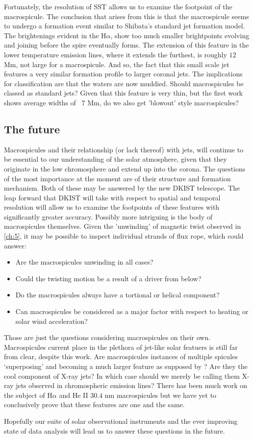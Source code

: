 Fortunately, the resolution of SST allows us to examine the footpoint of the macrospicule.
The conclusion that arises from this is that the macrospicule seems to undergo a formation event similar to Shibata's standard jet formation model.
The brightenings evident in the H$\alpha$, show too much smaller brightpoints evolving and joining before the spire eventually forms.
The extension of this feature in the lower temperature emission lines, where it extends the furthest, is roughly $12$ Mm, not large for a macrospicule.
And so, the fact that this small scale jet features a very similar formation profile to larger coronal jets.
The implications for classification are that the waters are now muddied.
Should macrospicules be classed as standard jets?
Given that this feature is very thin, but the first work shows average widths of ~$7$ Mm, do we also get 'blowout' style macrospicules?

 
\subsection{The future}

Macrospicules and their relationship (or lack thereof) with jets, will continue to be essential to our understanding of the solar atmosphere, given that they originate in the low chromosphere and extend up into the corona.
The questions of the most importance at the moment are of their structure and formation mechanism.
Both of these may be answered by the new DKIST telescope.
The leap forward that DKIST will take with respect to spatial and temporal resolution will allow us to examine the footpoints of these features with significantly greater accuracy.
Possibly more intriguing is the body of macrospicules themselves.
Given the 'unwinding' of magnetic twist observed in \cref{ch:5}, it may be possible to inspect individual strands of flux rope, which could answer:

\begin{itemize}
	\item{Are the macrospicules unwinding in all cases?}
	\item{Could the twisting motion be a result of a driver from below?}
	\item{Do the macrospicules always have a tortional or helical component?}
	\item{Can macrospicules be considered as a major factor with respect to heating or solar wind acceleration?}
\end{itemize}
 
 
Those are just the questions considering macrospicules on their own.
Macrospicules current place in the plethora of jet-like solar featuers is still far from clear, despite this work.
Are macrospicules instances of multiple spicules `superposing' and becoming a much larger feature as supposed by \cite{Xia2005}?
Are they the cool component of X-ray jets? In which case should we merely be calling them X-ray jets observed in chromospheric emission lines?
There has been much work on the subject of H$\alpha$ and He II $30.4$ nm macrospicules but we have yet to conclusively prove that these features are one and the same.  
 
 
 
Hopefully our suite of solar observational instruments and the ever improving state of data analysis will lead us to answer these questions in the future. 
 


